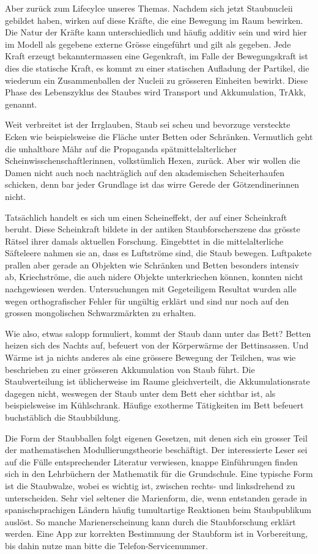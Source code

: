 Aber zurück zum Lifecylce unseres Themas. Nachdem sich jetzt Staubnucleii gebildet haben, wirken auf diese Kräfte, die eine Bewegung im Raum bewirken. Die Natur der Kräfte kann unterschiedlich und häufig additiv sein und wird hier im Modell als gegebene externe Grösse eingeführt und gilt als gegeben. Jede Kraft erzeugt bekanntermassen eine Gegenkraft, im Falle der Bewegungskraft ist dies die statische Kraft, es kommt zu einer statischen Aufladung der Partikel, die wiederum ein Zusammenballen der Nucleii zu grösseren Einheiten bewirkt. Diese Phase des Lebenszyklus des Staubes wird Transport und Akkumulation, TrAkk, genannt. 

Weit verbreitet ist der Irrglauben, Staub sei scheu und bevorzuge versteckte Ecken wie beispielsweise die Fläche unter Betten oder Schränken. Vermutlich geht die unhaltbare Mähr auf die Propaganda spätmittelalterlicher Scheinwisschenschaftlerinnen, volkstümlich Hexen, zurück. Aber wir wollen die Damen nicht auch noch nachträglich auf den akademischen Scheiterhaufen schicken, denn bar jeder Grundlage ist das wirre Gerede der Götzendinerinnen nicht. 

Tatsächlich handelt es sich um einen Scheineffekt, der auf einer Scheinkraft beruht. Diese Scheinkraft bildete in der antiken Staubforscherszene das grösste Rätsel ihrer damals aktuellen Forschung. Eingebttet in die mittelalterliche Säfteleere nahmen sie an, dass es Luftströme sind, die Staub bewegen. Luftpakete prallen aber gerade an Objekten wie Schränken und Betten besonders intensiv ab, Kriechströme, die auch nidere Objekte unterkriechen können, konnten nicht nachgewiesen werden. Untersuchungen mit Gegeteiligem Resultat wurden alle wegen orthografischer Fehler für ungültig erklärt und sind nur noch auf den grossen mongolischen Schwarzmärkten zu erhalten. 

Wie also, etwas salopp formuliert, kommt der Staub dann unter das Bett? Betten heizen sich des Nachts auf, befeuert von der Körperwärme der Bettinsassen. Und Wärme ist ja nichts anderes als eine grössere Bewegung der Teilchen, was wie beschrieben zu einer grösseren Akkumulation von Staub führt. Die Staubverteilung ist üblicherweise im Raume gleichverteilt, die Akkumulationsrate dagegen nicht, weswegen der Staub unter dem Bett eher sichtbar ist, als beispielsweise im Kühlschrank. Häufige exotherme Tätigkeiten im Bett befeuert buchstäblich die Staubbildung.

Die Form der Staubballen folgt eigenen Gesetzen, mit denen sich ein grosser Teil der mathematischen Modullierungstheorie beschäftigt. Der interessierte Leser sei auf die Fülle entsprechender Literatur verwiesen, knappe Einführungen finden sich in den Lehrbüchern der Mathematik für die Grundschule. Eine typische Form ist die Staubwalze, wobei es wichtig ist, zwischen rechts- und linksdrehend zu unterscheiden. Sehr viel seltener die Marienform, die, wenn entstanden gerade in spanischsprachigen Ländern häufig tumultartige Reaktionen beim Staubpublikum auslöst. So manche Marienerscheinung kann durch die Staubforschung erklärt werden. Eine App zur korrekten Bestimmung der Staubform ist in Vorbereitung, bis dahin nutze man bitte die Telefon-Servicenummer.

